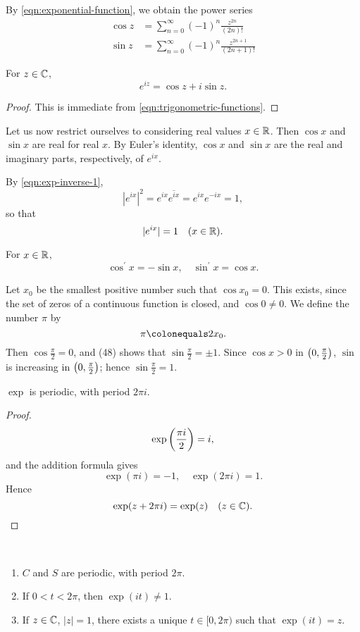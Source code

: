 By \eqref{eqn:exponential-function}, we obtain the power series
\begin{align*}
\cos z&=\sum_{n=0}^{\infty}(-1)^n\frac{z^{2n}}{(2n)!}\\
\sin z&=\sum_{n=0}^{\infty}(-1)^n\frac{z^{2n+1}}{(2n+1)!}
\end{align*}

\begin{lemma}
For $z\in\mathbb C$,
\[e^{iz}=\cos z+i\sin z.\]
\end{lemma}

\begin{proof}
This is immediate from \eqref{eqn:trigonometric-functions}.
\end{proof}

Let us now restrict ourselves to considering real values $x\in\mathbb R$. Then $\cos x$ and $\sin x$ are real for real $x$. 
By Euler's identity, $\cos x$ and $\sin x$ are the real and imaginary parts, respectively, of $e^{ix}$.

By \eqref{eqn:exp-inverse-1},
\[|e^{ix}|^2=e^{ix}\overline{e^{ix}}=e^{ix}e^{-ix}=1,\]
so that
\[|e^{ix}|=1\quad(x\in\mathbb R).\]

\begin{lemma}
For $x\in\mathbb R$,
\[\cos^\prime x=-\sin x,\quad\sin^\prime x=\cos x.\]
\end{lemma}

Let $x_0$ be the smallest positive number such that $\cos x_0=0$. This exists, since the set of zeros of a continuous function is closed, and $\cos 0\neq0$. We define the number $\pi$ by
\[\pi\colonequals 2x_0.\]
Then $\cos\frac{\pi}{2}=0$, and (48) shows that $\sin\frac{\pi}{2}=\pm 1$. Since $\cos x>0$ in $\left(0,\frac{\pi}{2}\right)$, $\sin$ is increasing in $\left(0,\frac{\pi}{2}\right)$; hence $\sin\frac{\pi}{2}=1$. 

\begin{lemma}
$\exp$ is periodic, with period $2\pi i$.
\end{lemma}

\begin{proof} 
\[\exp\left(\frac{\pi i}{2}\right)=i,\]
and the addition formula gives
\[\exp(\pi i)=-1,\quad\exp(2\pi i)=1.\]
Hence
\[\exp(z+2\pi i)=\exp(z)\quad(z\in\mathbb C).\]
\end{proof}

\begin{lemma} \
\begin{enumerate}[label=(\roman*)]
\item $C$ and $S$ are periodic, with period $2\pi$.
\item If $0<t<2\pi$, then $\exp(it)\neq1$.
\item If $z\in\mathbb C$, $|z|=1$, there exists a unique $t\in[0,2\pi)$ such that $\exp(it)=z$.
\end{enumerate}
\end{lemma}
\pagebreak

